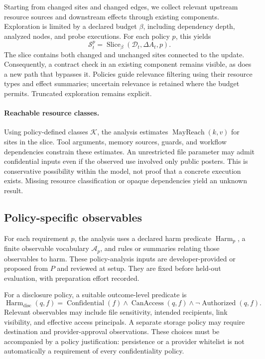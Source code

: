 Starting from changed sites and changed edges, we collect relevant upstream
resource sources and downstream effects through existing components.
Exploration is limited by a declared budget \(\beta\), including dependency
depth, analyzed nodes, and probe executions. For each policy \(p\), this yields
\[
 \mathcal S_t^p
 =\operatorname{Slice}_{\beta}(\mathcal D_t,\Delta A_t,p).
\]
The slice contains both changed and unchanged sites connected to the update.
Consequently, a contract check in an existing component remains visible,
as does a new path that bypasses it. Policies guide relevance filtering using
their resource types and effect summaries; uncertain relevance is retained
where the budget permits. Truncated exploration remains explicit.

\paragraph{Reachable resource classes.}
Using policy-defined classes \(\mathcal K\), the analysis estimates
\(\operatorname{MayReach}(k,v)\) for sites in the slice. Tool arguments,
memory sources, guards, and workflow dependencies constrain these estimates.
An unrestricted file parameter may admit confidential inputs even if the
observed use involved only public posters. This is conservative possibility
within the model, not proof that a concrete execution exists. Missing resource
classification or opaque dependencies yield an unknown result.

\subsection{Policy-specific observables}
\label{sec:attributes}

For each requirement \(p\), the analysis uses a declared harm predicate
\(\operatorname{Harm}_p\), a finite observable vocabulary
\(\mathcal A_p\), and rules or summaries relating those observables to harm.
These policy-analysis inputs are developer-provided or proposed from \(P\) and reviewed at setup. They are fixed before held-out evaluation, with preparation effort recorded.

For a disclosure policy, a suitable outcome-level predicate is
\[
 \operatorname{Harm}_{\mathrm{disc}}(q,f)
 =
 \operatorname{Confidential}(f)
 \land\operatorname{CanAccess}(q,f)
 \land\neg\operatorname{Authorized}(q,f).
\]
Relevant observables may include file sensitivity, intended recipients, link
visibility, and effective access principals. A separate storage policy may
require destination and provider-approval observations. These choices must
be accompanied by a policy justification: persistence or a provider whitelist
is not automatically a requirement of every confidentiality policy.

